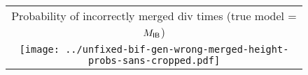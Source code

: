\documentclass[border=10pt,varwidth=30cm]{standalone}
\newcommand{\bimodel}{\ensuremath{M_{\textrm{\sffamily IB}}}\xspace}
\begin{document}
\begin{figure}
    \setlength\arrayrulewidth{2pt}
    \centering
    \begin{tabular}{@{}c@{}}
        {\large Probability of incorrectly merged div times (true model = \bimodel)} \\[0.5ex]
        \texttt{[image: ../unfixed-bif-gen-wrong-merged-height-probs-sans-cropped.pdf]} \\
    \end{tabular}
\end{figure}
\end{document}
